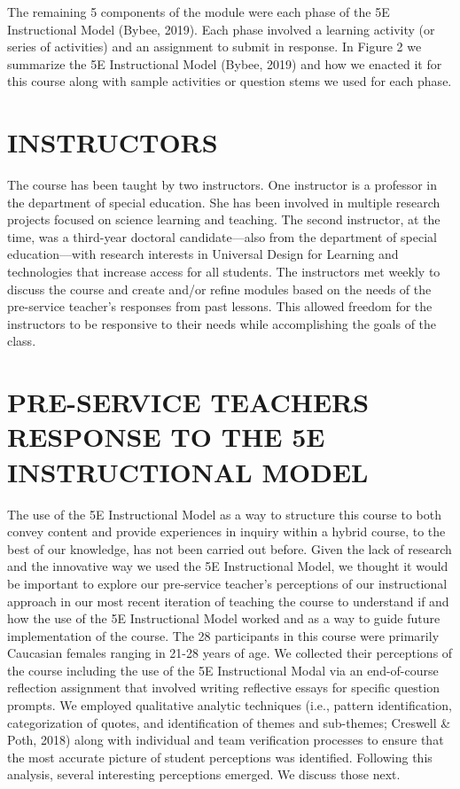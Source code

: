 \documentclass[11.5pt]{sig-alternate} %
\begin{document}
\begin{large}
The remaining 5 components of the module were each phase of the 5E Instructional Model (Bybee, 2019). Each phase involved a learning activity (or series of activities) and an assignment to submit in response. In Figure 2 we summarize the 5E Instructional Model (Bybee, 2019) and how we enacted it for this course along with sample activities or question stems we used for each phase.

\section*{INSTRUCTORS}

The course has been taught by two instructors. One instructor is a professor in the department of special education. She has been involved in multiple research projects focused on science learning and teaching. The second instructor, at the time, was a third-year doctoral candidate—also from the department of special education—with research interests in Universal Design for Learning and technologies that increase access for all students. The instructors met weekly to discuss the course and create and/or refine modules based on the needs of the pre-service teacher's responses from past lessons. This allowed freedom for the instructors to be responsive to their needs while accomplishing the goals of the class.  

\section*{PRE-SERVICE TEACHERS RESPONSE TO THE 5E INSTRUCTIONAL MODEL}
	
The use of the 5E Instructional Model as a way to structure this course to both convey content and provide experiences in inquiry within a hybrid course, to the best of our knowledge, has not been carried out before. Given the lack of research and the innovative way we used the 5E Instructional Model, we thought it would be important to explore our pre-service teacher’s perceptions of our instructional approach in our most recent iteration of teaching the course to understand if and how the use of the 5E Instructional Model worked and as a way to guide future implementation of the course. The 28 participants in this course were primarily Caucasian females ranging in 21-28 years of age. We collected their perceptions of the course including the use of the 5E Instructional Modal via an end-of-course reflection assignment that involved writing reflective essays for specific question prompts. We employed qualitative analytic techniques (i.e., pattern identification, categorization of quotes, and identification of themes and sub-themes; Creswell \& Poth, 2018) along with individual and team verification processes to ensure that the most accurate picture of student perceptions was identified. Following this analysis, several interesting perceptions emerged. We discuss those next.


\end{large}
\end{document}
